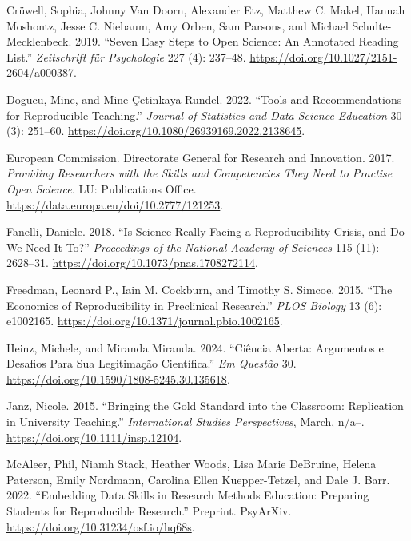 \documentclass[
  a4paper,
]{article}
\newlength{\cslhangindent}
\newenvironment{CSLReferences}[2] %
 {\begin{list}{}{%
  \setlength{\itemindent}{0pt}
  \setlength{\leftmargin}{0pt}
  \setlength{\parsep}{0pt}
  \ifodd #1
   \setlength{\leftmargin}{\cslhangindent}
   \setlength{\itemindent}{-1\cslhangindent}
  \fi
  \setlength{\itemsep}{#2\baselineskip}}}
 {\end{list}}
\begin{document}
\begin{CSLReferences}{1}{0}
Crüwell, Sophia, Johnny Van Doorn, Alexander Etz, Matthew C. Makel,
Hannah Moshontz, Jesse C. Niebaum, Amy Orben, Sam Parsons, and Michael
Schulte-Mecklenbeck. 2019. {``Seven {Easy Steps} to {Open Science}: {An
Annotated Reading List}.''} \emph{Zeitschrift f{ü}r Psychologie} 227
(4): 237--48. \url{https://doi.org/10.1027/2151-2604/a000387}.

Dogucu, Mine, and Mine Çetinkaya-Rundel. 2022. {``Tools and
{Recommendations} for {Reproducible Teaching}.''} \emph{Journal of
Statistics and Data Science Education} 30 (3): 251--60.
\url{https://doi.org/10.1080/26939169.2022.2138645}.

European Commission. Directorate General for Research and Innovation.
2017. \emph{Providing Researchers with the Skills and Competencies They
Need to Practise {Open Science}.} LU: Publications Office.
\url{https://data.europa.eu/doi/10.2777/121253}.

Fanelli, Daniele. 2018. {``Is Science Really Facing a Reproducibility
Crisis, and Do We Need It To?''} \emph{Proceedings of the National
Academy of Sciences} 115 (11): 2628--31.
\url{https://doi.org/10.1073/pnas.1708272114}.

Freedman, Leonard P., Iain M. Cockburn, and Timothy S. Simcoe. 2015.
{``The {Economics} of {Reproducibility} in {Preclinical Research}.''}
\emph{PLOS Biology} 13 (6): e1002165.
\url{https://doi.org/10.1371/journal.pbio.1002165}.

Heinz, Michele, and Miranda Miranda. 2024. {``Ci{ê}ncia {Aberta}:
Argumentos e Desafios Para Sua Legitima{ç}{ã}o Cient{í}fica.''} \emph{Em
Quest{ã}o} 30. \url{https://doi.org/10.1590/1808-5245.30.135618}.

Janz, Nicole. 2015. {``Bringing the {Gold Standard} into the
{Classroom}: {Replication} in {University Teaching}.''}
\emph{International Studies Perspectives}, March, n/a--.
\url{https://doi.org/10.1111/insp.12104}.

McAleer, Phil, Niamh Stack, Heather Woods, Lisa Marie DeBruine, Helena
Paterson, Emily Nordmann, Carolina Ellen Kuepper-Tetzel, and Dale J.
Barr. 2022. {``Embedding {Data Skills} in {Research Methods Education}:
{Preparing Students} for {Reproducible Research}.''} Preprint. PsyArXiv.
\url{https://doi.org/10.31234/osf.io/hq68s}.


\end{CSLReferences}
\end{document}
